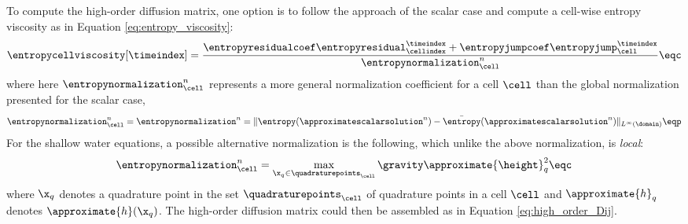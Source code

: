 To compute the high-order diffusion matrix, one option is to follow the approach
of the scalar case and compute a cell-wise entropy viscosity as in Equation
\eqref{eq:entropy_viscosity}:
\begin{equation}
   \entropycellviscosity[\timeindex] = \frac{\entropyresidualcoef
   \entropyresidual_\cellindex^\timeindex
   + \entropyjumpcoef\entropyjump_\cell^\timeindex}
   {\entropynormalization^n_\cell}
   \eqc
\end{equation}
where here $\entropynormalization^n_\cell$ represents a more general
normalization coefficient for a cell $\cell$ than the global normalization
presented for the scalar case,
\begin{equation}
  \entropynormalization^n_\cell = \entropynormalization^n =
    \|\entropy(\approximatescalarsolution^n)
   -\bar{\entropy}(\approximatescalarsolution^n)\|_{L^\infty(\domain)} \eqp
\end{equation}
For the shallow water equations, a possible alternative normalization
is the following, which unlike the above normalization, is \emph{local}:
\begin{equation}
  \entropynormalization^n_\cell =
    \max\limits_{\x_q\in\quadraturepoints_\cell} \gravity \approximate{\height}_q^2
  \eqc
\end{equation}
where $\x_q$ denotes a quadrature point in the set $\quadraturepoints_\cell$
of quadrature points in a cell $\cell$ and
$\approximate{h}_q$ denotes $\approximate{h}(\x_q)$. The high-order diffusion matrix
could then be assembled as in Equation \eqref{eq:high_order_Dij}.


